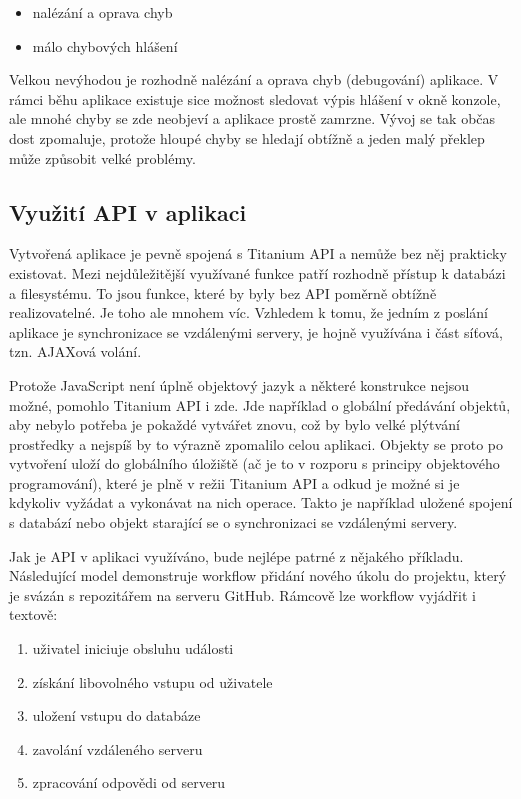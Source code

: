 \begin{itemize}
\item nalézání a oprava chyb
\item málo chybových hlášení
\end{itemize}

Velkou nevýhodou je rozhodně nalézání a oprava chyb (debugování) aplikace. V rámci běhu aplikace existuje sice možnost sledovat výpis hlášení v okně konzole, ale mnohé chyby se zde neobjeví a aplikace prostě zamrzne. Vývoj se tak občas dost zpomaluje, protože hloupé chyby se hledají obtížně a jeden malý překlep může způsobit velké problémy.

\subsection{Využití API v aplikaci}

Vytvořená aplikace je pevně spojená s Titanium API a nemůže bez něj prakticky existovat. Mezi nejdůležitější využívané funkce patří rozhodně přístup k databázi a filesystému. To jsou funkce, které by byly bez API poměrně obtížně realizovatelné. Je toho ale mnohem víc. Vzhledem k tomu, že jedním z poslání aplikace je synchronizace se vzdálenými servery, je hojně využívána i část síťová, tzn. AJAXová volání. 

Protože JavaScript není úplně objektový jazyk a některé konstrukce nejsou možné, pomohlo Titanium API i zde. Jde například o globální předávání objektů, aby nebylo potřeba je pokaždé vytvářet znovu, což by bylo velké plýtvání prostředky a nejspíš by to výrazně zpomalilo celou aplikaci. Objekty se proto po vytvoření uloží do globálního úložiště (ač je to v rozporu s principy objektového programování), které je plně v režii Titanium API a odkud je možné si je kdykoliv vyžádat a vykonávat na nich operace. Takto je například uložené spojení s databází nebo objekt starající se o synchronizaci se vzdálenými servery.

Jak je API v aplikaci využíváno, bude nejlépe patrné z nějakého příkladu. Následující model demonstruje workflow přidání nového úkolu do projektu, který je svázán s repozitářem na serveru GitHub. Rámcově lze workflow vyjádřit i textově:

\begin{enumerate}
\item uživatel iniciuje obsluhu události
\item získání libovolného vstupu od uživatele
\item uložení vstupu do databáze
\item zavolání vzdáleného serveru
\item zpracování odpovědi od serveru
\end{enumerate}

